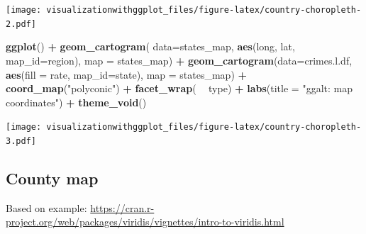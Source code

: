 \documentclass[]{krantz}
\makeatletter
\newenvironment{Shaded}{\begin{snugshade}}{\end{snugshade}}
\newcommand{\DataTypeTok}[1]{\textcolor[rgb]{0.13,0.29,0.53}{#1}}
\newcommand{\KeywordTok}[1]{\textcolor[rgb]{0.13,0.29,0.53}{\textbf{#1}}}
\newcommand{\NormalTok}[1]{#1}
\newcommand{\OperatorTok}[1]{\textcolor[rgb]{0.81,0.36,0.00}{\textbf{#1}}}
\newcommand{\StringTok}[1]{\textcolor[rgb]{0.31,0.60,0.02}{#1}}
\newenvironment{kframe}{%
\medskip{}
\setlength{\fboxsep}{.8em}
 \def\at@end@of@kframe{}%
 \ifinner\ifhmode%
  \def\at@end@of@kframe{\end{minipage}}%
  \begin{minipage}{\columnwidth}%
 \fi\fi%
 \def\FrameCommand##1{\hskip\@totalleftmargin \hskip-\fboxsep
 \colorbox{shadecolor}{##1}\hskip-\fboxsep
     \hskip-\linewidth \hskip-\@totalleftmargin \hskip\columnwidth}%
 \MakeFramed {\advance\hsize-\width
   \@totalleftmargin\z@ \linewidth\hsize
   \@setminipage}}%
 {\par\unskip\endMakeFramed%
 \at@end@of@kframe}
\renewenvironment{Shaded}{\begin{kframe}}{\end{kframe}}
\makeatother
\begin{document}
\texttt{[image: visualizationwithggplot\_files/figure-latex/country-choropleth-2.pdf]}

\begin{Shaded}
\begin{Highlighting}[]
\KeywordTok{ggplot}\NormalTok{() }\OperatorTok{+}
\StringTok{    }\KeywordTok{geom_cartogram}\NormalTok{( }\DataTypeTok{data=}\NormalTok{states_map, }\KeywordTok{aes}\NormalTok{(long, lat, }\DataTypeTok{map_id=}\NormalTok{region), }\DataTypeTok{map =}\NormalTok{ states_map) }\OperatorTok{+}
\StringTok{    }\KeywordTok{geom_cartogram}\NormalTok{(}\DataTypeTok{data=}\NormalTok{crimes.l.df, }\KeywordTok{aes}\NormalTok{(}\DataTypeTok{fill =}\NormalTok{ rate, }\DataTypeTok{map_id=}\NormalTok{state), }\DataTypeTok{map =}\NormalTok{ states_map) }\OperatorTok{+}
\StringTok{    }\KeywordTok{coord_map}\NormalTok{(}\StringTok{"polyconic"}\NormalTok{) }\OperatorTok{+}
\StringTok{    }\KeywordTok{facet_wrap}\NormalTok{( }\OperatorTok{~}\StringTok{ }\NormalTok{type) }\OperatorTok{+}
\StringTok{    }\KeywordTok{labs}\NormalTok{(}\DataTypeTok{title =} \StringTok{"ggalt: map coordinates"}\NormalTok{) }\OperatorTok{+}
\StringTok{    }\KeywordTok{theme_void}\NormalTok{()}
\end{Highlighting}
\end{Shaded}

\texttt{[image: visualizationwithggplot\_files/figure-latex/country-choropleth-3.pdf]}

\hypertarget{county-map}{%
\subsection{County map}\label{county-map}}

Based on example:
\url{https://cran.r-project.org/web/packages/viridis/vignettes/intro-to-viridis.html}
\end{document}
